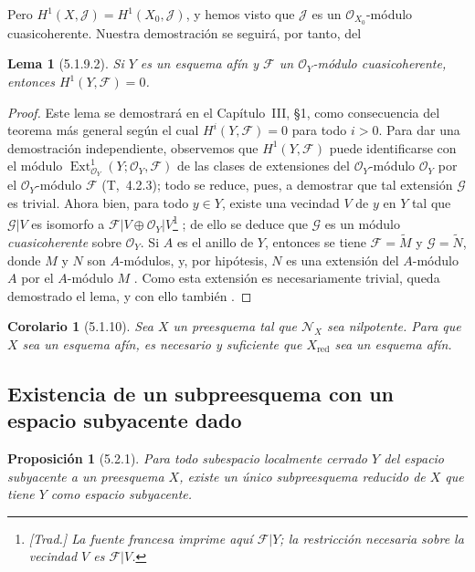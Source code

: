 \documentclass[oneside]{amsart}
\theoremstyle{ega-env-style}
\theoremstyle{ega-thm-env-style}
\newtheorem*{proposition}{Proposición}
\newtheorem*{lemma}{Lema}
\newtheorem*{corollary}{Corolario}
\theoremstyle{ega-defn-env-style}
\def\mathcal{\mathscr}
\def\sh{\mathcal}                   %
\let\EGAOriginalLabel\label
\renewcommand{\label}[1]{\phantomsection\EGAOriginalLabel{#1}}
\begin{document}
Pero $H^1(X,\mathscr{J})=H^1(X_0,\mathscr{J})$, y hemos visto que $\mathscr{J}$ es un $\mathscr{O}_{X_0}$-módulo cuasicoherente.
Nuestra demostración se seguirá, por tanto, del
\begin{lemma}[5.1.9.2]
\label{I.5.1.9.2}
Si $Y$ es un esquema afín y $\mathscr{F}$ un $\mathscr{O}_Y$-módulo cuasicoherente, entonces $H^1(Y,\mathscr{F})=0$.
\end{lemma}

\begin{proof}
Este lema se demostrará en el Capítulo~III, §1, como consecuencia del teorema más general según el cual $H^i(Y,\mathscr{F})=0$ para todo $i>0$.
Para dar una demostración independiente, observemos que $H^1(Y,\mathscr{F})$ puede identificarse con el módulo $\operatorname{Ext}^1_{\mathscr{O}_Y}
(Y;\mathscr{O}_Y,\mathscr{F})$ de las clases de extensiones del $\mathscr{O}_Y$-módulo $\mathscr{O}_Y$ por el $\mathscr{O}_Y$-módulo $\mathscr{F}$ (T,~4.2.3);
todo se reduce, pues, a demostrar que tal extensión $\mathscr{G}$ es trivial.
Ahora bien, para todo $y\in Y$, existe una vecindad $V$ de $y$ en $Y$ tal que $\mathscr{G}|V$ es isomorfo a $\mathscr{F}|V\oplus\mathscr{O}_Y|V$\footnote{\emph{[Trad.] La fuente francesa imprime aquí $\sh{F}|Y$; la restricción necesaria sobre la vecindad $V$ es $\sh{F}|V$.}} ;
de ello se deduce que $\mathscr{G}$ es un módulo \emph{cuasicoherente} sobre $\mathscr{O}_Y$.
Si $A$ es el anillo de $Y$, entonces se tiene $\mathscr{F}=\widetilde{M}$ y $\mathscr{G}=\widetilde{N}$, donde $M$ y $N$ son $A$-módulos, y, por hipótesis, $N$ es una extensión del $A$-módulo $A$ por el $A$-módulo $M$ .
Como esta extensión es necesariamente trivial, queda demostrado el lema, y con ello también .
\end{proof}

\begin{corollary}[5.1.10]
\label{I.5.1.10}
Sea $X$ un preesquema tal que $\mathscr{N}_X$ sea nilpotente.
Para que $X$ sea un esquema afín, es necesario y suficiente que $X_{\mathrm{red}}$ sea un esquema afín.
\end{corollary}

\subsection{Existencia de un subpreesquema con un espacio subyacente dado}
\label{subsection:I.5.2}

\begin{proposition}[5.2.1]
\label{I.5.2.1}
Para todo subespacio localmente cerrado $Y$ del espacio subyacente a un preesquema $X$, existe un único subpreesquema reducido de $X$ que tiene $Y$ como espacio subyacente.
\end{proposition}
\end{document}
